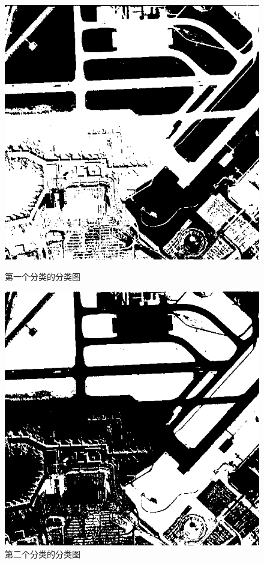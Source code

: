 \begin{figure}[H]
	\centering
	\begin{minipage}{0.45\linewidth}
		\centering
		\includegraphics[width=\linewidth]{figure/airport_44_Class_01_Logical.png}
		\caption{第一个分类的分类图}
		\label{fig:airport_44_class_1_logical}
	\end{minipage}
	\begin{minipage}{0.45\linewidth}
		\centering
		\includegraphics[width=\linewidth]{figure/airport_44_Class_02_Logical.png}
		\caption{第二个分类的分类图}
		\label{fig:airport_44_class_2_logical}
	\end{minipage}
\end{figure}
